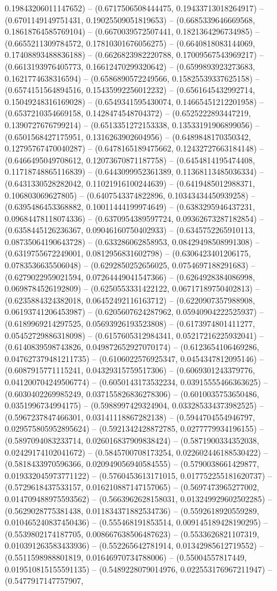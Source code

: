 0.19843206011147652) -- (0.6717506508444475, 0.19433713018264917) -- (0.6701149149751431, 0.19025509051819653) -- (0.6685339646669568, 0.18618764585769104) -- (0.6670039572507441, 0.1821364296734985) -- (0.6655211309784572, 0.17810301676056275) -- (0.6640818083144069, 0.17408893488836188) -- (0.6626823982220788, 0.17009567543969217) -- (0.6613193976405773, 0.16612470299320642) -- (0.6599893923273683, 0.1621774638316594) -- (0.6586890572249566, 0.15825539337625158) -- (0.6574151564894516, 0.15435992256012232) -- (0.6561645432992714, 0.15049248316169028) -- (0.6549341595430074, 0.14665451212201958) -- (0.6537210354669158, 0.1428474548704372) -- (0.6525222893447219, 0.1390727676799214) -- (0.6513351272153338, 0.13533191906899056) -- (0.6501568427175951, 0.1316263902604956) -- (0.6489848170350342, 0.12795767470040287) -- (0.6478165189475662, 0.12432727663184148) -- (0.6466495049708612, 0.12073670871187758) -- (0.6454814195474408, 0.11718748865116839) -- (0.6443099952361389, 0.11368113485036334) -- (0.6431330528282042, 0.11021916100244639) -- (0.6419485012988371, 0.106803069627805) -- (0.6407543374822896, 0.10343434450939258) -- (0.6395486453368882, 0.10011444199974649) -- (0.6383295946437231, 0.09684478118074336) -- (0.6370954389597724, 0.09362673287182854) -- (0.6358445126236367, 0.09046160750402933) -- (0.6345752265910113, 0.08735064190643728) -- (0.633286062858953, 0.08429498508991308) -- (0.6319755672249001, 0.0812956831602798) -- (0.6306423401206175, 0.0783536635506048) -- (0.6292850252656025, 0.0754697188291683) -- (0.6279022959021594, 0.07264449041547366) -- (0.6264928384086998, 0.0698784526192809) -- (0.6250553331422122, 0.06717189750402813) -- (0.6235884324382018, 0.06452492116163712) -- (0.6220907357988908, 0.06193741206453987) -- (0.6205607624287962, 0.05940904222525937) -- (0.6189969214297525, 0.05693926193523808) -- (0.6173974801411277, 0.05452729886318098) -- (0.6157605312984341, 0.05217216225932041) -- (0.6140839598743826, 0.049872652927070174) -- (0.6123654106469286, 0.047627379481211735) -- (0.6106022576925347, 0.0454347812095146) -- (0.6087915771115241, 0.04329315759517306) -- (0.6069301243379776, 0.041200704249506774) -- (0.6050143173532234, 0.03915555466363625) -- (0.6030402269985249, 0.037155826836278306) -- (0.6010035753650486, 0.0351996734994175) -- (0.5988997429324904, 0.033285334373982525) -- (0.5967237847466301, 0.03141118867282138) -- (0.5944704554946797, 0.029575805952895624) -- (0.5921342428872785, 0.0277779934196155) -- (0.5897094083233714, 0.026016837909838424) -- (0.5871900334352038, 0.02429174102041672) -- (0.5845700708173254, 0.022602446188530422) -- (0.5818433970596366, 0.020949056940584555) -- (0.5790038661429877, 0.019332045973771122) -- (0.5760453613171015, 0.017752255181620737) -- (0.5729618437533157, 0.016210887147157065) -- (0.5697473965277002, 0.014709488975593562) -- (0.5663962628158031, 0.013249929602502285) -- (0.5629028775381438, 0.011834371882534736) -- (0.5592618920559289, 0.010465240837450436) -- (0.555468191853514, 0.009145189428190295) -- (0.5539802174187705, 0.008667638506487623) -- (0.5533626821107319, 0.010391263583433936) -- (0.552265642781914, 0.01342985612719552) -- (0.5511598988801819, 0.01646970734788006) -- (0.55004557817449, 0.019510815155591135) -- (0.5489228079014976, 0.022553176967211947) -- (0.5477917147757907, 